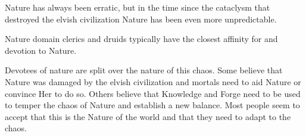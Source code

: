 Nature has always been erratic, but in the time since the cataclysm that destroyed the elvish civilization Nature has been even more unpredictable.

Nature domain clerics and druids typically have the closest affinity for and devotion to Nature.

Devotees of nature are split over the nature of this chaos.
Some believe that Nature was damaged by the elvish civilization and mortals need to aid Nature or convince Her to do so.
Others believe that Knowledge and Forge need to be used to temper the chaos of Nature and establish a new balance.
Most people seem to accept that this is the Nature of the world and that they need to adapt to the chaos.
